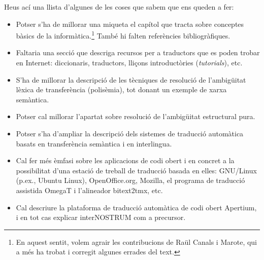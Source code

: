   Heus ací una llista d'algunes de les coses que sabem que ens queden
  a fer:
\begin{itemize}
\item Potser s'ha de millorar una miqueta el capítol que tracta sobre
  conceptes bàsics de la informàtica.\footnote{En aquest sentit, volem
    agrair les contribucions de Raül Canals i Marote, qui a més ha
    trobat i corregit algunes errades del text.}  També hi falten
  referències bibliogràfiques.
\item Faltaria una secció que descriga recursos per a traductors que
  es poden trobar en Internet: diccionaris, traductors, lliçons
  introductòries (\emph{tutorials}), etc.
\item S'ha de millorar la descripció de les tècniques de resolució de
  l'ambigüitat lèxica de transferència (polisèmia), tot donant un
  exemple de xarxa semàntica.
\item Potser cal millorar l'apartat sobre resolució de l'ambigüitat
  estructural pura.
\item Potser s'ha d'ampliar la descripció dels sistemes de traducció
  automàtica basats en transferència semàntica i en interlingua.
\item Cal fer més èmfasi sobre les aplicacions de codi obert i en
  concret a la possibilitat d'una estació de treball de traducció
  basada en elles: GNU/Linux (p.ex., Ubuntu Linux), OpenOffice.org,
  Mozilla, el programa de traducció assistida OmegaT i l'alineador
  bitext2tmx, etc.
\item Cal descriure la plataforma de traducció automàtica de codi
  obert Apertium, i en tot cas explicar interNOSTRUM com a precursor.
\end{itemize}

